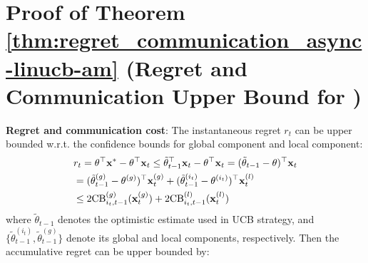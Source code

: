 \section{Proof of Theorem \ref{thm:regret_communication_async-linucb-am} (Regret and Communication Upper Bound for \modeltwo{})}
\noindent \textbf{Regret and communication cost}:
The instantaneous regret $r_{t}$ can be upper bounded w.r.t. the confidence bounds for global component and local component: 
\begin{align*}
    & r_{t}  = \theta^\top \mathbf{x}^{*} - \theta^\top \mathbf{x}_{t}  \leq \tilde{\theta}^\top_{t-1} \mathbf{x}_{t} - \theta^\top \mathbf{x}_{t} = (\tilde{\theta}_{t-1}-\theta)^\top \mathbf{x}_{t} \\
    & = (\tilde{\theta}^{(g)}_{t-1}-\theta^{(g)})^\top \mathbf{x}_{t}^{(g)} + (\tilde{\theta}^{(i_{t})}_{t-1}-\theta^{(i_{t})})^\top \mathbf{x}_{t}^{(l)} \\
    & \leq 2 \text{CB}^{(g)}_{i_{t},t-1}(\mathbf{x}_{t}^{(g)}) + 2 \text{CB}^{(l)}_{i_{t},t-1}(\mathbf{x}_{t}^{(l)})
\end{align*}
where $\tilde{\theta}_{t-1}$ denotes the optimistic estimate used in UCB strategy, and $\{\tilde{\theta}^{(i_{t})}_{t-1},\tilde{\theta}^{(g)}_{t-1}\}$ denote its global and local components, respectively.
Then the accumulative regret can be upper bounded by: 
